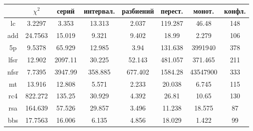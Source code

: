 \documentclass[bachelor, och, coursework]{shiza}
\begin{document}
	\begin{center}
		\begin{tabular}{|c|c|c|c|c|c|c|c|}
			\hline
			$ $ & $\chi^2$ & серий & интервал. & разбиений & перест. & монот. & конфл. \\
			\hline
			lc & \cellcolor[RGB]{71,167,106} 3.2297 & \cellcolor[RGB]{71,167,106} 3.353 & \cellcolor[RGB]{71,167,106} 13.313 & \cellcolor[RGB]{71,167,106} 2.037 & \cellcolor[RGB]{155,45,48} 119.287 & \cellcolor[RGB]{155,45,48} 46.48 & \cellcolor[RGB]{71,167,106} 148 \\
			\hline
			add & \cellcolor[RGB]{155,45,48} 24.7563 & \cellcolor[RGB]{71,167,106} 15.019 & \cellcolor[RGB]{71,167,106} 9.321 & \cellcolor[RGB]{71,167,106} 9.402 & \cellcolor[RGB]{71,167,106} 18.99 & \cellcolor[RGB]{71,167,106} 2.279 & \cellcolor[RGB]{71,167,106} 106 \\
			\hline
			5p & \cellcolor[RGB]{71,167,106} 9.5378 & \cellcolor[RGB]{155,45,48} 65.929 & \cellcolor[RGB]{71,167,106} 12.985 & \cellcolor[RGB]{71,167,106} 3.94 & \cellcolor[RGB]{155,45,48} 131.638 & \cellcolor[RGB]{155,45,48} 3991940 & \cellcolor[RGB]{71,167,106} 378 \\
			\hline
			lfsr & \cellcolor[RGB]{71,167,106} 12.902 & \cellcolor[RGB]{155,45,48} 2097.11 & \cellcolor[RGB]{155,45,48} 30.225 & \cellcolor[RGB]{155,45,48} 52.143 & \cellcolor[RGB]{155,45,48} 481.057 & \cellcolor[RGB]{155,45,48} 371.465 & \cellcolor[RGB]{71,167,106} 211 \\
			\hline
			nfsr & \cellcolor[RGB]{71,167,106} 7.7395 & \cellcolor[RGB]{155,45,48} 3947.99 & \cellcolor[RGB]{155,45,48} 358.885 & \cellcolor[RGB]{155,45,48} 677.402 & \cellcolor[RGB]{155,45,48} 1584.28 & \cellcolor[RGB]{155,45,48} 43547900 & \cellcolor[RGB]{71,167,106} 333 \\
			\hline
			mt & \cellcolor[RGB]{71,167,106} 13.916 & \cellcolor[RGB]{71,167,106} 12.808 & \cellcolor[RGB]{71,167,106} 5.571 & \cellcolor[RGB]{71,167,106} 2.233 & \cellcolor[RGB]{71,167,106} 20.038 & \cellcolor[RGB]{71,167,106} 6.745 & \cellcolor[RGB]{71,167,106} 115 \\
			\hline
			rc4 & \cellcolor[RGB]{155,45,48} 822.272 & \cellcolor[RGB]{155,45,48} 135.25 & \cellcolor[RGB]{155,45,48} 30.929 & \cellcolor[RGB]{71,167,106} 4.392 & \cellcolor[RGB]{71,167,106} 26.81 & \cellcolor[RGB]{71,167,106} 10.65 & \cellcolor[RGB]{71,167,106} 130 \\
			\hline
			rsa & \cellcolor[RGB]{155,45,48} 164.639 & \cellcolor[RGB]{155,45,48} 57.526 & \cellcolor[RGB]{155,45,48} 29.857 & \cellcolor[RGB]{71,167,106} 3.496 & \cellcolor[RGB]{155,45,48} 11.238 & \cellcolor[RGB]{71,167,106} 18.575 & \cellcolor[RGB]{71,167,106} 87 \\
			\hline
			bbs & \cellcolor[RGB]{71,167,106} 17.7563 & \cellcolor[RGB]{71,167,106} 16.006 & \cellcolor[RGB]{71,167,106} 6.135 & \cellcolor[RGB]{71,167,106} 4.856 & \cellcolor[RGB]{71,167,106} 18.029 & \cellcolor[RGB]{71,167,106} 1.422 & \cellcolor[RGB]{71,167,106} 99 \\
			\hline
		\end{tabular}
	\end{center}
	
\end{document}
